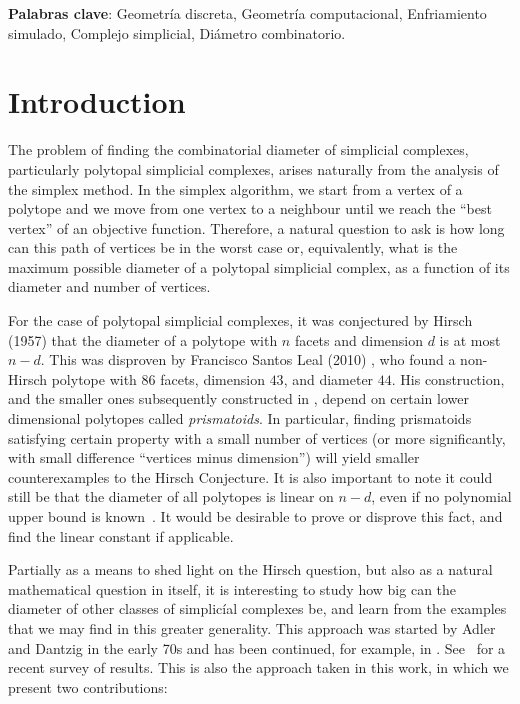 \documentclass[12pt,a4paper]{article}
\theoremstyle{plain}
\theoremstyle{definition}
\begin{document}
\textbf{Palabras clave}: Geometría discreta, Geometría computacional, Enfriamiento simulado, Complejo simplicial, Diámetro combinatorio.
\newpage

\tableofcontents
\clearpage
\vspace*{\fill}
\clearpage
\setcounter{page}{1}

\section{Introduction}
The problem of finding the combinatorial diameter of simplicial complexes, particularly polytopal simplicial complexes, arises naturally from the analysis of the simplex method. In the simplex algorithm, we start from a vertex of a polytope and we move from one vertex to a neighbour until we reach the ``best vertex'' of an objective function. Therefore, a natural question to ask is how long can this path of vertices be in the worst case or, equivalently, what is the maximum possible diameter of a polytopal simplicial complex, as a function of its diameter and number of vertices.

For the case of polytopal simplicial complexes, it was conjectured by Hirsch (1957) that the diameter of a polytope with $n$ facets and dimension $d$ is at most $n-d$. This was disproven by Francisco Santos Leal (2010) \cite{counterexample}, who found a non-Hirsch polytope with $86$ facets, dimension $43$, and diameter $44$. His construction, and the smaller ones subsequently constructed in \cite{improvement}, depend on certain lower dimensional polytopes called \emph{prismatoids}. In particular, finding prismatoids satisfying certain property with a small number of vertices (or more significantly, with small difference ``vertices minus dimension'') will yield smaller counterexamples to the Hirsch Conjecture. It is also important to note it could still be that the diameter of all polytopes is linear on $n-d$, even if no polynomial upper bound is known~\cite{Kalai:polymath3}. It would be desirable to prove or disprove this fact, and find the linear constant if applicable. 

Partially as a means to shed light on the Hirsch question, but also as a natural mathematical question in itself, it is interesting to study how big can the diameter of other classes of simplicíal complexes be, and learn from the examples that we may find in this greater generality. This approach was started by Adler and Dantzig in the early 70s and has been continued, for example, in \cite{ManiWalkup,nonPolytopal}. See~\cite{Santos:progress} for a recent survey of results. This is also the approach taken in this work, in which we present two contributions:
\end{document}
